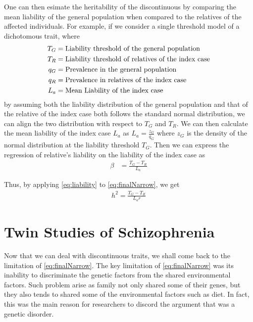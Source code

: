 \documentclass[12pt]{book}
\newcommand*{\glng}{\glsentrylong}
\begin{document}
	One can then esimate the heritability of the discontinuous by comparing the mean liability of the general population when compared to the relatives of the affected individuals.	
	For example, if we consider a single threshold model of a dichotomous trait, where 
	\begin{align}
	T_G &= \text{Liability threshold of the general population}\notag\\
	T_R &= \text{Liability threshold of relatives of the index case} \notag\\
	q_G &= \text{Prevalence in the general population}\notag\\
	q_R &= \text{Prevalence in relatives of the index case}\notag\\
	L_a &= \text{Mean Liability of the index case} \notag
	\end{align}
	by assuming both the liability distribution of the general population and that of the relative of the index case both follows the standard normal distribution, we can align the two distribution with respect to $T_G$ and $T_R$. 
	We can then calculate the mean liability of the index case $L_a$ as $L_a=\frac{z_G}{q_G}$ where $z_G$ is the density of the normal distribution at the liability threshold $T_G$.
	Then we can express the regression of relative's liability on the liability of the index case as
	\begin{align}
	\beta &= \frac{T_G-T_R}{L_a}
	\label{eq:liability}
	\end{align}
	
	Thus, by applying \cref{eq:liability} to \cref{eq:finalNarrow}, we get
	\begin{align}
	h^2 =\frac{T_G-T_R}{L_ar}
	\end{align}
	
		
	\section{Twin Studies of Schizophrenia}
	Now that we can deal with discontinuous traits, we shall come back to the limitation of \cref{eq:finalNarrow}.
	The key limitation of \cref{eq:finalNarrow} was its inability to discriminate the genetic factors from the shared environmental factors.
	Such problem arise as family not only shared some of their genes, but they also tends to shared some of the environmental factors such as diet. 
	In fact, this was the main reason for researchers to discord the argument that \glng{scz} was a genetic disorder.
	
\end{document}
